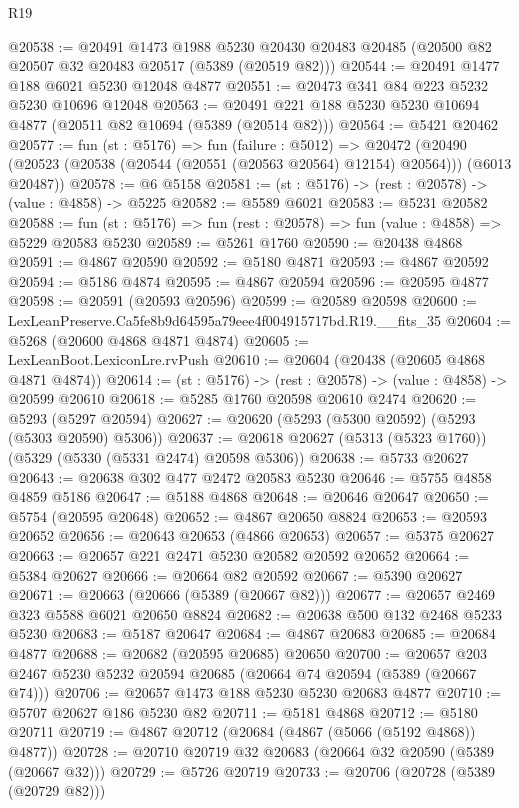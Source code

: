 \begin{lexlean}{R19}
\begin{coremodule}
@20538 := @20491
    @1473
    @1988
    @5230
    @20430
    @20483
    @20485
    (@20500 @82 @20507 @32 @20483 @20517 (@5389 (@20519 @82)))
@20544 := @20491 @1477 @188 @6021 @5230 @12048 @4877
@20551 := @20473 @341 @84 @223 @5232 @5230 @10696 @12048
@20563 := @20491 @221 @188 @5230 @5230 @10694 @4877 (@20511 @82 @10694 (@5389 (@20514 @82)))
@20564 := @5421 @20462
@20577 := fun (st : @5176) =>
  fun (failure : @5012) =>
  @20472 (@20490 (@20523 (@20538 (@20544 (@20551 (@20563 @20564) @12154) @20564))) (@6013 @20487))
@20578 := @6 @5158
@20581 := (st : @5176) -> (rest : @20578) -> (value : @4858) -> @5225
@20582 := @5589 @6021
@20583 := @5231 @20582
@20588 := fun (st : @5176) => fun (rest : @20578) => fun (value : @4858) => @5229 @20583 @5230
@20589 := @5261 @1760
@20590 := @20438 @4868
@20591 := @4867 @20590
@20592 := @5180 @4871
@20593 := @4867 @20592
@20594 := @5186 @4874
@20595 := @4867 @20594
@20596 := @20595 @4877
@20598 := @20591 (@20593 @20596)
@20599 := @20589 @20598
@20600 := LexLeanPreserve.Ca5fe8b9d64595a79eee4f004915717bd.R19.__fits_35
@20604 := @5268 (@20600 @4868 @4871 @4874)
@20605 := LexLeanBoot.LexiconLre.rvPush
@20610 := @20604 (@20438 (@20605 @4868 @4871 @4874))
@20614 := (st : @5176) -> (rest : @20578) -> (value : @4858) -> @20599 @20610
@20618 := @5285 @1760 @20598 @20610 @2474
@20620 := @5293 (@5297 @20594)
@20627 := @20620 (@5293 (@5300 @20592) (@5293 (@5303 @20590) @5306))
@20637 := @20618 @20627 (@5313 (@5323 @1760)) (@5329 (@5330 (@5331 @2474) @20598 @5306))
@20638 := @5733 @20627
@20643 := @20638 @302 @477 @2472 @20583 @5230
@20646 := @5755 @4858 @4859 @5186
@20647 := @5188 @4868
@20648 := @20646 @20647
@20650 := @5754 (@20595 @20648)
@20652 := @4867 @20650 @8824
@20653 := @20593 @20652
@20656 := @20643 @20653 (@4866 @20653)
@20657 := @5375 @20627
@20663 := @20657 @221 @2471 @5230 @20582 @20592 @20652
@20664 := @5384 @20627
@20666 := @20664 @82 @20592
@20667 := @5390 @20627
@20671 := @20663 (@20666 (@5389 (@20667 @82)))
@20677 := @20657 @2469 @323 @5588 @6021 @20650 @8824
@20682 := @20638 @500 @132 @2468 @5233 @5230
@20683 := @5187 @20647
@20684 := @4867 @20683
@20685 := @20684 @4877
@20688 := @20682 (@20595 @20685) @20650
@20700 := @20657 @203 @2467 @5230 @5232 @20594 @20685 (@20664 @74 @20594 (@5389 (@20667 @74)))
@20706 := @20657 @1473 @188 @5230 @5230 @20683 @4877
@20710 := @5707 @20627 @186 @5230 @82
@20711 := @5181 @4868
@20712 := @5180 @20711
@20719 := @4867 @20712 (@20684 (@4867 (@5066 (@5192 @4868)) @4877))
@20728 := @20710 @20719 @32 @20683 (@20664 @32 @20590 (@5389 (@20667 @32)))
@20729 := @5726 @20719
@20733 := @20706 (@20728 (@5389 (@20729 @82)))

\end{coremodule}
\end{lexlean}
